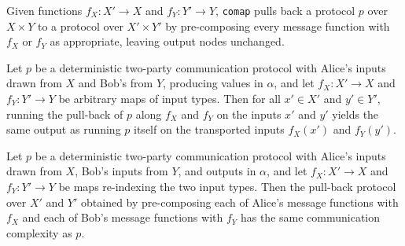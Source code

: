 \begin{definition}
\label{CommunicationComplexity.Deterministic.Protocol.comap}
\leanok
{}
Given functions $f_X : X' \to X$ and $f_Y : Y' \to Y$, \texttt{comap} pulls back a protocol
$p$ over $X \times Y$ to a protocol over $X' \times Y'$ by pre-composing every message
function with $f_X$ or $f_Y$ as appropriate, leaving output nodes unchanged.
\end{definition}

\begin{theorem}
\label{CommunicationComplexity.Deterministic.Protocol.comap_run}
\leanok
{}
Let $p$ be a deterministic two-party communication protocol with Alice's inputs drawn
from $X$ and Bob's from $Y$, producing values in $\alpha$, and let $f_X : X' \to X$ and
$f_Y : Y' \to Y$ be arbitrary maps of input types. Then for all $x' \in X'$ and $y' \in
Y'$, running the pull-back of $p$ along $f_X$ and $f_Y$ on the inputs $x'$ and $y'$
yields the same output as running $p$ itself on the transported inputs $f_X(x')$ and
$f_Y(y')$.
\end{theorem}

\begin{theorem}
\label{CommunicationComplexity.Deterministic.Protocol.comap_complexity}
\leanok
{}
Let $p$ be a deterministic two-party communication protocol with Alice's inputs drawn
from $X$, Bob's inputs from $Y$, and outputs in $\alpha$, and let $f_X : X' \to X$ and
$f_Y : Y' \to Y$ be maps re-indexing the two input types. Then the pull-back protocol
over $X'$ and $Y'$ obtained by pre-composing each of Alice's message functions with
$f_X$ and each of Bob's message functions with $f_Y$ has the same communication
complexity as $p$.
\end{theorem}

